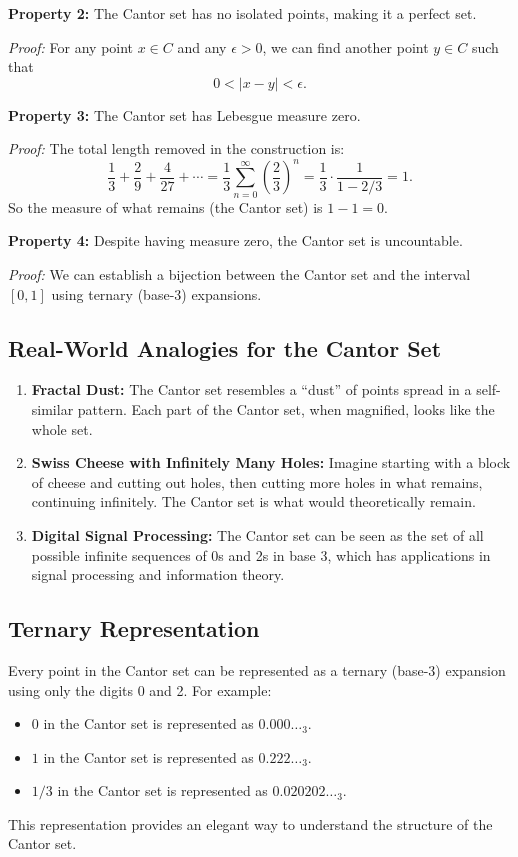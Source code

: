 \documentclass{article}
\begin{document}
\bigskip

\textbf{Property 2:} The Cantor set has no isolated points, making it a perfect set.

\textit{Proof:} For any point $x \in C$ and any $\epsilon > 0$, we can find another point $y \in C$ such that 
\[
0 < |x - y| < \epsilon.
\]

\bigskip

\textbf{Property 3:} The Cantor set has Lebesgue measure zero.

\textit{Proof:} The total length removed in the construction is:
\[
\frac{1}{3} + \frac{2}{9} + \frac{4}{27} + \cdots = \frac{1}{3} \sum_{n=0}^{\infty} \left(\frac{2}{3}\right)^n = \frac{1}{3} \cdot \frac{1}{1-2/3} = 1.
\]
So the measure of what remains (the Cantor set) is $1 - 1 = 0$.

\bigskip

\textbf{Property 4:} Despite having measure zero, the Cantor set is uncountable.

\textit{Proof:} We can establish a bijection between the Cantor set and the interval $[0,1]$ using ternary (base-3) expansions.

\subsection{Real-World Analogies for the Cantor Set}

\begin{enumerate}
    \item \textbf{Fractal Dust:} The Cantor set resembles a ``dust'' of points spread in a self-similar pattern. Each part of the Cantor set, when magnified, looks like the whole set.
    \item \textbf{Swiss Cheese with Infinitely Many Holes:} Imagine starting with a block of cheese and cutting out holes, then cutting more holes in what remains, continuing infinitely. The Cantor set is what would theoretically remain.
    \item \textbf{Digital Signal Processing:} The Cantor set can be seen as the set of all possible infinite sequences of 0s and 2s in base 3, which has applications in signal processing and information theory.
\end{enumerate}

\subsection{Ternary Representation}

Every point in the Cantor set can be represented as a ternary (base-3) expansion using only the digits 0 and 2. For example:
\begin{itemize}
    \item $0$ in the Cantor set is represented as $0.000\ldots_3$.
    \item $1$ in the Cantor set is represented as $0.222\ldots_3$.
    \item $1/3$ in the Cantor set is represented as $0.020202\ldots_3$.
\end{itemize}
This representation provides an elegant way to understand the structure of the Cantor set.
\end{document}
